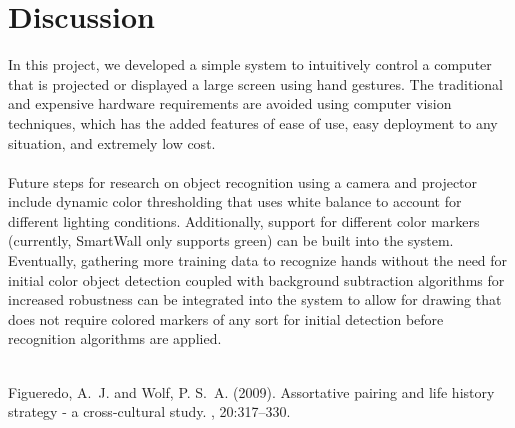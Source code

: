 \documentclass[twoside,twocolumn]{article}
\begin{document}
\section{Discussion}
In this project, we developed a simple system to intuitively control a computer that is projected or displayed a large screen using hand gestures. The traditional and expensive hardware requirements are avoided using computer vision techniques, which has the added features of ease of use, easy deployment to any situation, and extremely low cost.\\ \\ Future steps for research on object recognition using a camera and projector include dynamic color thresholding that uses white balance to account for different lighting conditions. Additionally, support for different color markers (currently, SmartWall only supports green) can be built into the system. Eventually, gathering more training data to recognize hands without the need for initial color object detection coupled with background subtraction algorithms for increased robustness can be integrated into the system to allow for drawing that does not require colored markers of any sort for initial detection before recognition algorithms are applied.\\ \\


\begin{thebibliography}{99} %

Figueredo, A.~J. and Wolf, P. S.~A. (2009).
\newblock Assortative pairing and life history strategy - a cross-cultural
  study.
, 20:317--330.
 
\end{thebibliography}

\end{document}
